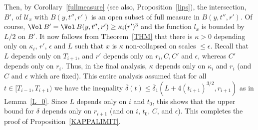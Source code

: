 Then, by Corollary~\ref{fullmeasure} (see also,
Proposition~\ref{lips}), the intersection, $B'$, of ${\mathcal U}_x$
with $B(y,t'',r')$
 is an open subset of full measure in $B(y,t'',r')$.
Of course, $\Vol\,B'=\Vol\,B(y,t'',r')\ge \kappa_i(r')^3$
and the function $l_x$ is bounded by $L/2$ on $B'$. It now follows
from Theorem~\ref{THM} that there is $\kappa>0$ depending only on
$\kappa_i$, $r'$, $\epsilon$ and $L$ such that $x$ is $\kappa$
non-collapsed on scales $\le \epsilon$. Recall that $L$ depends only
on $T_{i+1}$, and $r'$ depends only on $r_i,C,C'$ and $\epsilon$,
whereas $C'$ depends only on $r_i$. Thus, in the final analysis,
$\kappa$ depends only on $\kappa_i$ and $r_i$ (and $C$ and
$\epsilon$ which are fixed). This entire analysis assumed that for
all $t\in [T_{i-1},T_{i+1})$ we have the inequality
$\overline\delta(t)\le
\overline\delta_1(L+4(t_{i+1})^{3/2},r_{i+1})$ as in
Lemma~\ref{L_0}. Since $L$ depends only on $i$ and $t_0$, this shows
that the upper bound for $\delta$ depends only on $r_{i+1}$ (and on
$i$, $t_0$, $C$, and $\epsilon$). This completes the proof of
Proposition~\ref{KAPPALIMIT}.


